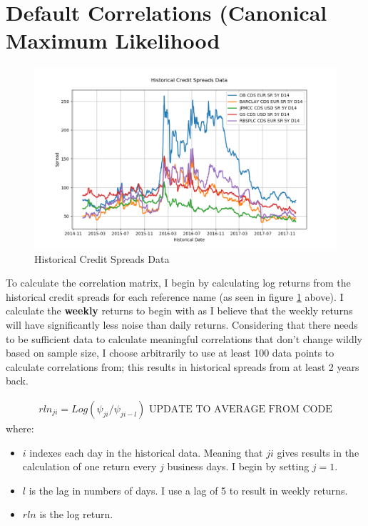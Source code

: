 \documentclass{report}
\theoremstyle{plain}
\theoremstyle{definition}
\begin{document}
\section{Default Correlations (Canonical Maximum Likelihood}

\begin{figure}[H]
	\begin{center}
		\includegraphics[width=15cm]{Historical_Credit_Spreads_Data.png}
		\caption{Historical Credit Spreads Data} 
		\label{Historical_Credit_Spreads_Data}
	\end{center}
\end{figure}

To calculate the correlation matrix, I begin by calculating log returns from the historical credit spreads for each reference name (as seen in figure \ref{Historical_Credit_Spreads_Data} above). I calculate the \textbf{weekly} returns to begin with as I believe that the weekly returns will have significantly less noise than daily returns. Considering that there needs to be sufficient data to calculate meaningful correlations that don't change wildly based on sample size, I choose arbitrarily to use at least 100 data points to calculate correlations from; this results in historical spreads from at least 2 years back. 

\begin{align*}
rln_{ji} = Log(\psi_{ji} / \psi_{ji - l}) \text{ UPDATE TO AVERAGE FROM CODE}
\end{align*}
where:
\begin{itemize}
	\item $i$ indexes each day in the historical data. Meaning that $ji$ gives results in the calculation of one return every $j$ business days. I begin by setting $j = 1$.
	\item $l$ is the lag in numbers of days. I use a lag of 5 to result in weekly returns.
	\item $rln$ is the log return.
\end{itemize}
\end{document}

